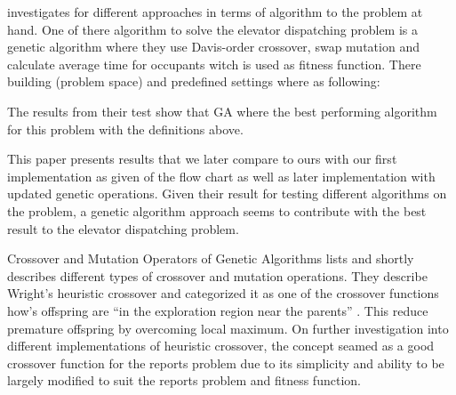\cite{ahmed2022investigation} investigates for different approaches in terms of algorithm to the problem at hand.  One of there algorithm to solve the elevator dispatching problem is a genetic algorithm where they use Davis-order crossover, swap mutation and calculate average time for occupants  witch is used as fitness function. There building (problem space) and predefined settings where as following:

The results from their test show that GA where the best performing algorithm for this problem with the definitions above.

This paper presents results that we later compare to ours with our first implementation as given of the flow chart \cite{tartan2016genetic} as well as later implementation with updated genetic operations. Given their result for testing different algorithms on the problem, a genetic algorithm approach seems to contribute with the best result to the elevator dispatching problem.

Crossover and Mutation Operators of Genetic Algorithms \cite{lim2017crossover} lists and shortly describes different types of crossover and mutation operations. They describe Wright's heuristic crossover and categorized it as one of the crossover functions how’s offspring are “in the exploration region near the parents” \cite{lim2017crossover} . This reduce premature offspring by overcoming local maximum. On further investigation into different implementations of heuristic crossover, the concept seamed as a good crossover function for the reports problem due to its simplicity and ability to be largely modified to suit the reports problem and fitness function.



